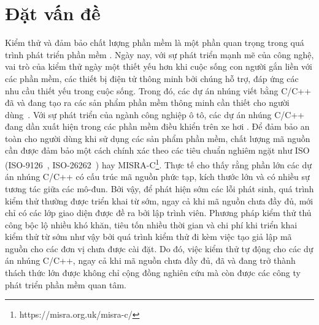 \chapter*{Đặt vấn đề}\label{chap1}
Kiểm thử và đảm bảo chất lượng phần mềm là một phần quan trọng trong quá trình phát triển phần mềm \cite{GiaoTrinhKiemThu}. Ngày nay, với sự phát triển mạnh mẽ của công nghệ, vai trò của kiểm thử ngày một thiết yếu hơn khi cuộc sống con người gắn liền với các phần mềm, các thiết bị điện tử thông minh bởi chúng hỗ trợ, đáp ứng các nhu cầu thiết yếu trong cuộc sống. Trong đó, các dự án nhúng viết bằng C/C++ đã và đang tạo ra các sản phẩm phần mềm thông minh cần thiết cho người dùng~\cite{plauger1997embedded}. Với sự phát triển của ngành công nghiệp ô tô, các dự án nhúng C/C++ đang dần xuất hiện trong các phần mềm điều khiển trên xe hơi \cite{gassmann2019towards}. Để đảm bảo an toàn cho người dùng khi sử dụng các sản phẩm phần mềm, chất lượng mã nguồn cần được đảm bảo một cách chính xác theo các tiêu chuẩn nghiêm ngặt như ISO (ISO-9126~\cite{ali2017iso}, ISO-26262~\cite{Hillenbrand2012_1000025616}) hay MISRA-C\footnote{https://misra.org.uk/misra-c/}. Thực tế cho thấy rằng phần lớn các dự án nhúng C/C++ có cấu trúc mã nguồn phức tạp, kích thước lớn và có nhiều sự tương tác giữa các mô-đun. Bởi vậy, để phát hiện sớm các lỗi phát sinh, quá trình kiểm thử thường được triển khai từ sớm, ngay cả khi mã nguồn chưa đầy đủ, mới chỉ có các lớp giao diện được đề ra bởi lập trình viên. Phương pháp kiểm thử thủ công bộc lộ nhiều khó khăn, tiêu tốn nhiều thời gian và chi phí khi triển khai kiểm thử từ sớm như vậy bởi quá trình kiểm thử đi kèm việc tạo giả lập mã nguồn cho các đơn vị chưa được cài đặt. Do đó, việc kiểm thử tự động cho các dự án nhúng C/C++, ngay cả khi mã nguồn chưa đầy đủ, đã và đang trở thành thách thức lớn được không chỉ cộng đồng nghiên cứu mà còn được các công ty phát triển phần mềm quan tâm.

